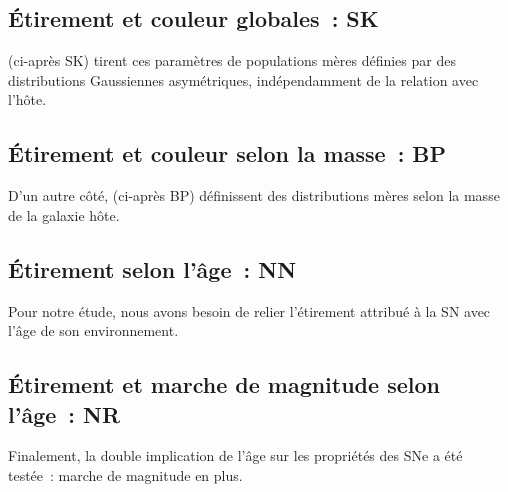 \documentclass[../main/main.tex]{subfiles}
\begin{document}



\subsection{Étirement et couleur globales~: SK}\label{ssec:sk}

\cite{scolnic2016} (ci-après SK) tirent ces paramètres de populations
mères définies par des distributions Gaussiennes asymétriques, indépendamment de
la relation avec l'hôte.

\subsection{Étirement et couleur selon la masse~: BP}\label{ssec:bp}

D'un autre côté, \cite{popovic2021a} (ci-après BP)
définissent des distributions mères selon la masse de la galaxie hôte.

\subsection{Étirement selon l'âge~: NN}\label{ssec:nn}

Pour notre étude, nous avons besoin de relier l'étirement attribué à la SN avec
l'âge de son environnement. 

\subsection{Étirement et marche de magnitude selon l'âge~: NR}\label{ssec:nr}

Finalement, la double implication de l'âge sur les propriétés des SNe a été
testée~: marche de magnitude en plus.
\end{document}
